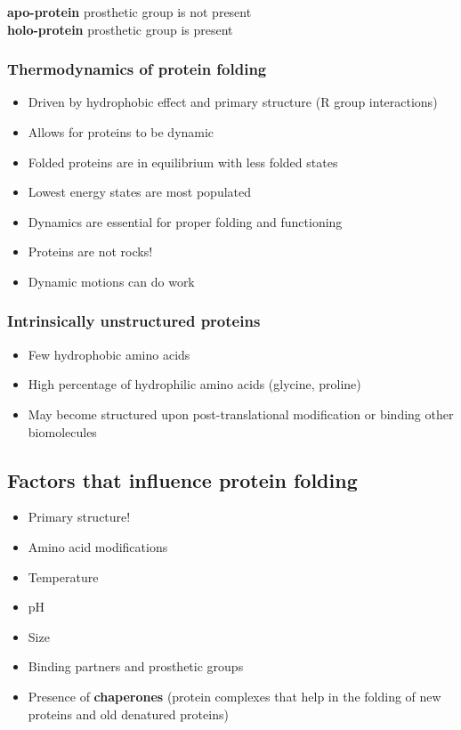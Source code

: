 \documentclass[letterpaper, 12pt]{article}
\begin{document}
\textbf{apo-protein} prosthetic group is not present \\
\textbf{holo-protein} prosthetic group is present

\subsubsection*{Thermodynamics of protein folding}

\begin{itemize}
\item Driven by hydrophobic effect and primary structure (R group interactions)
\item Allows for proteins to be dynamic
\item Folded proteins are in equilibrium with less folded states
\item Lowest energy states are most populated
\item Dynamics are essential for proper folding and functioning
\item Proteins are not rocks!
\item Dynamic motions can do work
\end{itemize}

\subsubsection*{Intrinsically unstructured proteins}

\begin{itemize}
\item Few hydrophobic amino acids
\item High percentage of hydrophilic amino acids (glycine, proline)
\item May become structured upon post-translational modification or binding other biomolecules
\end{itemize}

\subsection*{Factors that influence protein folding}

\begin{itemize}
\item Primary structure!
\item Amino acid modifications
\item Temperature
\item pH
\item Size
\item Binding partners and prosthetic groups
\item Presence of \textbf{chaperones} (protein complexes that help in the folding of new proteins and old denatured proteins)
\end{itemize}
\end{document}
